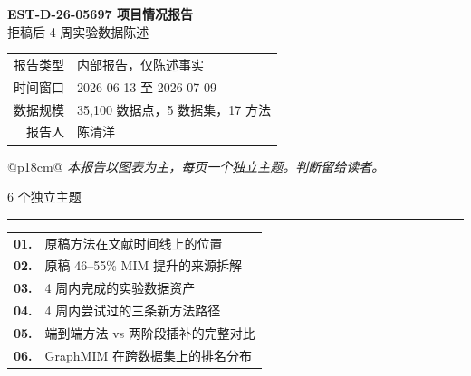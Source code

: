 \documentclass[11pt,a4paper,landscape]{ctexart}
\newcommand{\slidetitle}[2]{%
    \noindent{\Large\bfseries #1}\hfill{\normalsize\color{gray!70!black} #2}\par
    \vspace{0.2em}
    \noindent\textcolor{gray!50}{\rule{\linewidth}{0.6pt}}\par
    \vspace{0.6em}
}
\begin{document}
\begin{center}
\vspace*{2.2cm}
{\Huge\bfseries EST-D-26-05697 项目情况报告}\\[0.9em]
{\Large 拒稿后 4 周实验数据陈述}\\[3em]

\begin{tabular}{@{}rl@{}}
{\Large 报告类型}\quad & {\Large 内部报告，仅陈述事实} \\[0.6em]
{\Large 时间窗口}\quad & {\Large 2026-06-13 至 2026-07-09} \\[0.6em]
{\Large 数据规模}\quad & {\Large 35{,}100 数据点，5 数据集，17 方法} \\[0.6em]
{\Large 报告人}\quad & {\Large 陈清洋} \\
\end{tabular}

\vspace{3em}
\begin{tabular}{@{}p{18cm}@{}}
\centering\normalsize\itshape 本报告以图表为主，每页一个独立主题。判断留给读者。
\end{tabular}
\end{center}

\newpage

\slidetitle{目录}{6 个独立主题}

\vspace{2em}
\begin{center}
\begin{tabular}{@{}rp{18cm}@{}}
\Large\textbf{01.} & \Large 原稿方法在文献时间线上的位置 \\[1em]
\Large\textbf{02.} & \Large 原稿 46--55\% MIM 提升的来源拆解 \\[1em]
\Large\textbf{03.} & \Large 4 周内完成的实验数据资产 \\[1em]
\Large\textbf{04.} & \Large 4 周内尝试过的三条新方法路径 \\[1em]
\Large\textbf{05.} & \Large 端到端方法 vs 两阶段插补的完整对比 \\[1em]
\Large\textbf{06.} & \Large GraphMIM 在跨数据集上的排名分布 \\
\end{tabular}
\end{center}
\end{document}
